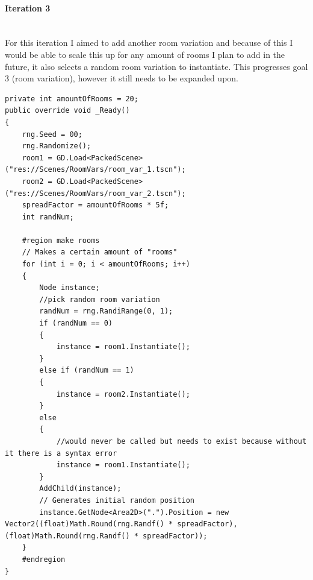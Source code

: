 \documentclass{article}
\newcommand{\myparagraph}[1]{\paragraph{#1}\mbox{}\\} %
\begin{document}
\myparagraph{Iteration 3}
For this iteration I aimed to add another room variation and because of this I would be able to scale this up for any amount of rooms I plan to add in the future, it also selects a random room variation to instantiate. This progresses goal 3 (room variation), however it still needs to be expanded upon.
\begin{lstlisting}
private int amountOfRooms = 20;
public override void _Ready()
{
    rng.Seed = 00;
    rng.Randomize();  
    room1 = GD.Load<PackedScene>("res://Scenes/RoomVars/room_var_1.tscn");
    room2 = GD.Load<PackedScene>("res://Scenes/RoomVars/room_var_2.tscn");
    spreadFactor = amountOfRooms * 5f;
    int randNum;
    
    #region make rooms
    // Makes a certain amount of "rooms"
    for (int i = 0; i < amountOfRooms; i++)
    {
        Node instance;
        //pick random room variation
        randNum = rng.RandiRange(0, 1);
        if (randNum == 0)
        {
            instance = room1.Instantiate();
        }
        else if (randNum == 1)
        {
            instance = room2.Instantiate();
        }
        else
        {
        	//would never be called but needs to exist because without it there is a syntax error
            instance = room1.Instantiate();
        }
        AddChild(instance);
        // Generates initial random position
        instance.GetNode<Area2D>(".").Position = new Vector2((float)Math.Round(rng.Randf() * spreadFactor), (float)Math.Round(rng.Randf() * spreadFactor)); 
    }
    #endregion
}
\end{lstlisting}
\end{document}
